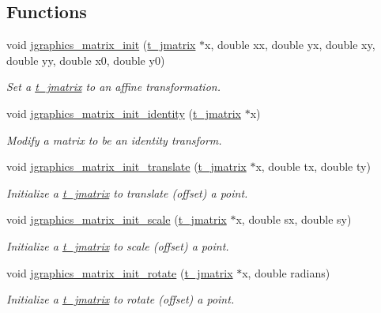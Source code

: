 \subsection*{Functions}
\begin{DoxyCompactItemize}
\item 
void \hyperlink{group__jmatrix_gafb24446d0616fbfca7d8bb96ba97b4ef}{jgraphics\_\-matrix\_\-init} (\hyperlink{structt__jmatrix}{t\_\-jmatrix} $\ast$x, double xx, double yx, double xy, double yy, double x0, double y0)
\begin{DoxyCompactList}\small\item\em Set a \hyperlink{structt__jmatrix}{t\_\-jmatrix} to an affine transformation. \item\end{DoxyCompactList}\item 
void \hyperlink{group__jmatrix_ga7f07986602f12117cfd79e82fb1338d7}{jgraphics\_\-matrix\_\-init\_\-identity} (\hyperlink{structt__jmatrix}{t\_\-jmatrix} $\ast$x)
\begin{DoxyCompactList}\small\item\em Modify a matrix to be an identity transform. \item\end{DoxyCompactList}\item 
void \hyperlink{group__jmatrix_gad5a50cfd545eaec3cf4adb02bb4f4995}{jgraphics\_\-matrix\_\-init\_\-translate} (\hyperlink{structt__jmatrix}{t\_\-jmatrix} $\ast$x, double tx, double ty)
\begin{DoxyCompactList}\small\item\em Initialize a \hyperlink{structt__jmatrix}{t\_\-jmatrix} to translate (offset) a point. \item\end{DoxyCompactList}\item 
void \hyperlink{group__jmatrix_ga1f8e9b71bc22f3744643cc25d24f0ac4}{jgraphics\_\-matrix\_\-init\_\-scale} (\hyperlink{structt__jmatrix}{t\_\-jmatrix} $\ast$x, double sx, double sy)
\begin{DoxyCompactList}\small\item\em Initialize a \hyperlink{structt__jmatrix}{t\_\-jmatrix} to scale (offset) a point. \item\end{DoxyCompactList}\item 
void \hyperlink{group__jmatrix_gaa2e4de77693076fab80df039bb56990e}{jgraphics\_\-matrix\_\-init\_\-rotate} (\hyperlink{structt__jmatrix}{t\_\-jmatrix} $\ast$x, double radians)
\begin{DoxyCompactList}\small\item\em Initialize a \hyperlink{structt__jmatrix}{t\_\-jmatrix} to rotate (offset) a point. \item\end{DoxyCompactList}\item 

\end{DoxyCompactItemize}
